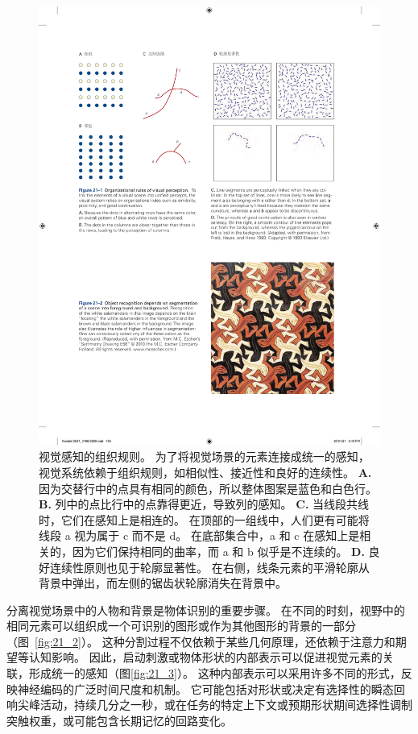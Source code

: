 \begin{figure}[htbp]
	\centering
	\includegraphics[width=1.0\linewidth]{chap21/fig_21_1}
	\caption{视觉感知的组织规则。
		为了将视觉场景的元素连接成统一的感知，视觉系统依赖于组织规则，如相似性、接近性和良好的连续性。
		\textbf{A.} 因为交替行中的点具有相同的颜色，所以整体图案是蓝色和白色行。
		\textbf{B.} 列中的点比行中的点靠得更近，导致列的感知。
		\textbf{C.} 当线段共线时，它们在感知上是相连的。
		在顶部的一组线中，人们更有可能将线段 a 视为属于 c 而不是 d。
		在底部集合中，a 和 c 在感知上是相关的，因为它们保持相同的曲率，而 a 和 b 似乎是不连续的。
		\textbf{D.} 良好连续性原则也见于轮廓显著性。
		在右侧，线条元素的平滑轮廓从背景中弹出，而左侧的锯齿状轮廓消失在背景中\cite{field1993contour}。}
	\label{fig:21_1}
\end{figure}


分离视觉场景中的人物和背景是物体识别的重要步骤。
在不同的时刻，视野中的相同元素可以组织成一个可识别的图形或作为其他图形的背景的一部分（图~\ref{fig:21_2}）。
这种分割过程不仅依赖于某些几何原理，还依赖于注意力和期望等认知影响。
因此，启动刺激或物体形状的内部表示可以促进视觉元素的关联，形成统一的感知（图\ref{fig:21_3}）。
这种内部表示可以采用许多不同的形式，反映神经编码的广泛时间尺度和机制。
它可能包括对形状或决定有选择性的瞬态回响尖峰活动，持续几分之一秒，或在任务的特定上下文或预期形状期间选择性调制突触权重，或可能包含长期记忆的回路变化。


